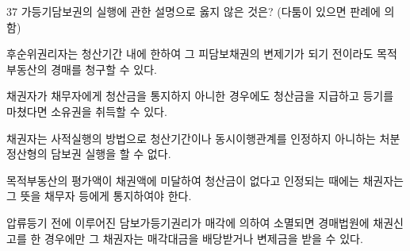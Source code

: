\begin{question}{37}
가등기담보권의 실행에 관한 설명으로 옳지 않은 것은? (다툼이 있으면 판례에 의함)
\begin{choices}
  \item 후순위권리자는 청산기간 내에 한하여 그 피담보채권의 변제기가 되기 전이라도 목적부동산의 경매를 청구할 수 있다.
  \item 채권자가 채무자에게 청산금을 통지하지 아니한 경우에도 청산금을 지급하고 등기를 마쳤다면 소유권을 취득할 수 있다.
  \item 채권자는 사적실행의 방법으로 청산기간이나 동시이행관계를 인정하지 아니하는 처분정산형의 담보권 실행을 할 수 없다.
  \item 목적부동산의 평가액이 채권액에 미달하여 청산금이 없다고 인정되는 때에는 채권자는 그 뜻을 채무자 등에게 통지하여야 한다.
  \item 압류등기 전에 이루어진 담보가등기권리가 매각에 의하여 소멸되면 경매법원에 채권신고를 한 경우에만 그 채권자는 매각대금을 배당받거나 변제금을 받을 수 있다.
\end{choices}
\end{question}
